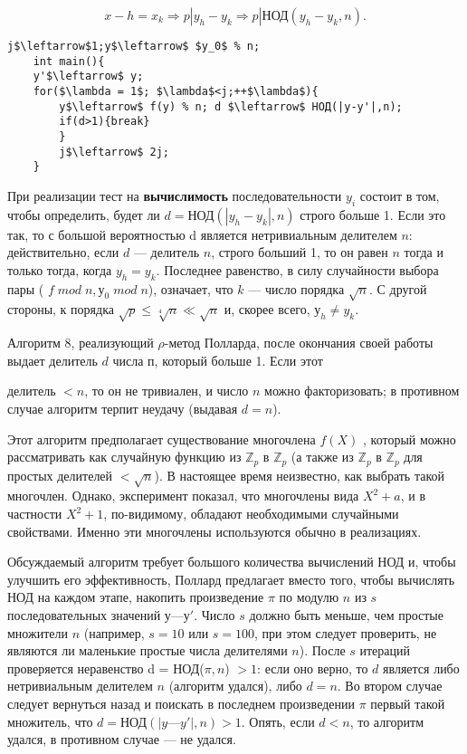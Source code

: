 	\begin{equation}
		x-h=x_k  \Rightarrow p|y_h-y_k \Rightarrow p|\text{НОД}(y_h-y_k,n).
	\end{equation}

	
	\begin{lstlisting}[mathescape=true,caption=Неоптимизированный $\rho$-метод Полларда]
	j$\leftarrow$1;y$\leftarrow$ $y_0$ % n;
	int main(){
	y'$\leftarrow$ y;
	for($\lambda = 1$; $\lambda$<j;++$\lambda$){
		y$\leftarrow$ f(y) % n; d $\leftarrow$ НОД(|y-y'|,n);
		if(d>1){break}
		}
		j$\leftarrow$ 2j;
	}
	\end{lstlisting}
	
	При реализации тест на {\bf вычислимость} последовательности $y_i$ состоит в том, чтобы определить, будет ли $d = \text{НОД}(|y_h -y_k|, n)$ строго	больше 1. Если это так, то с большой вероятностью d является нетривиальным делителем $n$: действительно, если $d$ — делитель $n$, строго
	больший 1, то он равен $n$ тогда и только тогда, когда $y_h=y_k$. Последнее равенство, в силу случайности выбора пары ( $f\;mod\;n, у_0\;mod\;n$), означает, что $k$ — число порядка $\sqrt{n}$. С другой стороны, $к$ порядка
	$\sqrt{p}\leqslant \sqrt[4]{n} \ll \sqrt{n}$ и, скорее всего, $у_h \neq y_k$.
	
	Алгоритм 8, реализующий $\rho$-метод Полларда, после окончания своей работы выдает делитель $d$ числа $п$, который больше 1. Если этот
	
	\pagebreak
	\noindent
	делитель $< n$, то он не тривиален, и число $n$ можно факторизовать; в противном случае алгоритм терпит неудачу (выдавая $d = n$). 
	
	Этот алгоритм предполагает существование многочлена $f(X)$ , который можно рассматривать как случайную функцию из $\mathbb Z_p$ в $\mathbb Z_p$ (а так­же из $\mathbb Z_p$ в  $\mathbb Z_p$ для простых делителей $< \sqrt{n}$). В настоящее время не­известно, как выбрать такой многочлен. Однако, эксперимент показал, что многочлены вида $X^2+a$, и в частности $X^2+ 1$, по-видимому, обла­дают необходимыми случайными свойствами. Именно эти многочлены	используются обычно в реализациях.
	
	Обсуждаемый алгоритм требует большого количества вычислений	НОД и, чтобы улучшить его эффективность, Поллард предлагает вместо того, чтобы вычислять НОД на каждом этапе, накопить произве­дение $\pi$ по модулю $n$ из $s$ последовательных значений $у — у'$. Число $s$	должно быть меньше, чем простые множители $n$ (например, $s = 10$ или $s = 100$, при этом следует проверить, не являются ли маленькие простые	числа делителями $n$). После $s$ итераций проверяется неравенство d =	НОД($\pi,n$)
	\noindent
	$> 1$: если оно верно, то $d$ является либо нетривиальным делителем $n$ (алгоритм удался), либо $d = n$. Во втором случае следует вернуться на­зад и поискать в последнем произведении $\pi$ первый такой множитель,	что $d = \text{НОД}(|y — y'|, n) > 1$. Опять, если $d < n$, то алгоритм удался, в	противном случае — не удался.
	
